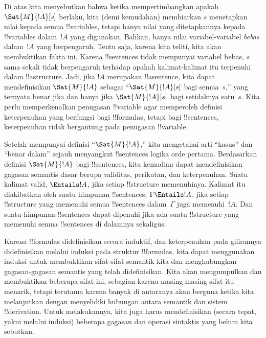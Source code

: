 \documentclass[../../../include/open-logic-section]{subfiles}
\begin{document}


Di atas kita menyebutkan bahwa ketika mempertimbangkan apakah
$\Sat{M}{!A}[s]$ berlaku, kita (demi kemudahan) membiarkan $s$ menetapkan
nilai kepada semua !!{variable}s, tetapi hanya nilai yang ditetapkannya kepada
!!{variable}s dalam~$!A$ yang digunakan. Bahkan, hanya nilai
variabel-variabel \emph{bebas} dalam~$!A$ yang berpengaruh. Tentu saja, karena
kita teliti, kita akan membuktikan fakta ini. Karena !!{sentence}s tidak
mempunyai variabel bebas, $s$ sama sekali tidak berpengaruh terhadap apakah
kalimat-kalimat itu terpenuhi dalam !!a{structure}. Jadi, jika $!A$ merupakan
!!a{sentence}, kita dapat mendefinisikan $\Sat{M}{!A}$ sebagai
``$\Sat{M}{!A}[s]$ bagi semua~$s$,'' yang ternyata benar jika dan hanya jika
$\Sat{M}{!A}[s]$ bagi setidaknya satu~$s$. Kita perlu memperkenalkan penugasan
!!{variable} agar memperoleh definisi keterpenuhan yang berfungsi bagi
!!{formula}s, tetapi bagi !!{sentence}s, keterpenuhan tidak bergantung pada
penugasan !!{variable}.

Setelah mempunyai definisi ``$\Sat{M}{!A}$,'' kita mengetahui arti ``kasus''
dan ``benar dalam'' sejauh menyangkut !!{sentence}s logika orde pertama.
Berdasarkan definisi $\Sat{M}{!A}$ bagi !!{sentence}s, kita kemudian dapat
mendefinisikan gagasan semantis dasar berupa validitas, perikutan, dan
keterpenuhan. Suatu kalimat valid, $\Entails !A$, jika setiap !!{structure}
memenuhinya. Kalimat itu diakibatkan oleh suatu himpunan !!{sentence}s,
$\Gamma \Entails !A$, jika setiap !!{structure} yang memenuhi semua
!!{sentence}s dalam~$\Gamma$ juga memenuhi~$!A$. Dan suatu himpunan
!!{sentence}s dapat dipenuhi jika ada suatu !!{structure} yang memenuhi semua
!!{sentence}s di dalamnya sekaligus.

Karena !!{formula}s didefinisikan secara induktif, dan keterpenuhan pada
gilirannya didefinisikan melalui induksi pada struktur !!{formula}s, kita
dapat menggunakan induksi untuk membuktikan sifat-sifat semantik kita dan
menghubungkan gagasan-gagasan semantis yang telah didefinisikan. Kita akan
mengumpulkan dan membuktikan beberapa sifat ini, sebagian karena masing-masing
sifat itu menarik, tetapi terutama karena banyak di antaranya akan berguna
ketika kita melanjutkan dengan menyelidiki hubungan antara semantik dan sistem
!!{derivation}. Untuk melakukannya, kita juga harus mendefinisikan (secara
tepat, yakni melalui induksi) beberapa gagasan dan operasi sintaktis yang
belum kita sebutkan.
\end{document}
